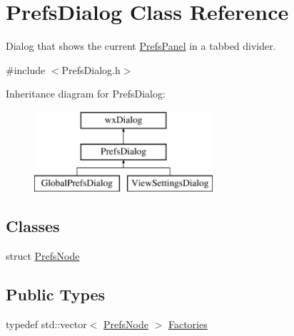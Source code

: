 \hypertarget{class_prefs_dialog}{}\section{Prefs\+Dialog Class Reference}
\label{class_prefs_dialog}


Dialog that shows the current \hyperlink{class_prefs_panel}{Prefs\+Panel} in a tabbed divider.  




{\ttfamily \#include $<$Prefs\+Dialog.\+h$>$}

Inheritance diagram for Prefs\+Dialog\+:\begin{figure}[H]
\begin{center}
\leavevmode
\includegraphics[height=3.000000cm]{class_prefs_dialog}
\end{center}
\end{figure}
\subsection*{Classes}
\begin{DoxyCompactItemize}
\item 
struct \hyperlink{struct_prefs_dialog_1_1_prefs_node}{Prefs\+Node}
\end{DoxyCompactItemize}
\subsection*{Public Types}
\begin{DoxyCompactItemize}
\item 
typedef std\+::vector$<$ \hyperlink{struct_prefs_dialog_1_1_prefs_node}{Prefs\+Node} $>$ \hyperlink{class_prefs_dialog_abce19159c638bc50c25147e479275388}{Factories}
\end{DoxyCompactItemize}
